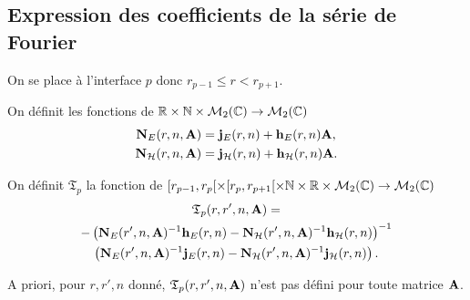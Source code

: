   \subsection{Expression des coefficients de la série de Fourier}

    On se place à l'interface \(p\) donc \(r_{p-1} \le r < r_{p+1} \).

    \begin{defn}
      \label{def:sphere:matrices_NE-NH}
      On définit les fonctions de \(\mathbb R\times \mathbb N \times \mathcal{M}_{2}(\mathbb C) \rightarrow \mathcal{M}_{2}(\mathbb C)\)
      \begin{align*}
        \mathbf{N}_{E}(r,n,\mathbf{A}) &= \mathbf{j}_{E}(r,n) + \mathbf{h}_{E}(r,n)\mathbf{A},
        \\
        \mathbf{N}_{\mathcal{H}}(r,n,\mathbf{A}) &= \mathbf{j}_{\mathcal{H}}(r,n) + \mathbf{h}_{\mathcal{H}}(r,n)\mathbf{A}.
      \end{align*}
    \end{defn}

    \begin{defn}%
      \label{def:sphere:transfert:reflexion}
      On définit \(\mathfrak{T}_p\) la fonction de \([r_{p-1}, r_p[\times[r_p, r_{p+1}[\times\mathbb N\times\mathbb R\times\mathcal{M}_2(\mathbb C)\rightarrow \mathcal{M}_{2}(\mathbb C)\)
      \begin{multline*}
        \mathfrak{T}_p(r,r',n,\mathbf{A}) = \\
          -\left(\mathbf{N}_{E}(r',n,\mathbf{A})^{-1}\mathbf{h}_{E}(r,n) - \mathbf{N}_{\mathcal{H}}(r',n,\mathbf{A})^{-1}\mathbf{h}_{\mathcal{H}}(r,n)\right)^{-1}
          \\
          \left(\mathbf{N}_{E}(r',n,\mathbf{A})^{-1}\mathbf{j}_{E}(r,n) - \mathbf{N}_{\mathcal{H}}(r',n,\mathbf{A})^{-1}\mathbf{j}_{\mathcal{H}}(r,n)\right).
      \end{multline*}
    \end{defn}
    A priori, pour \(r,r',n\) donné, \(\mathfrak{T}_p(r,r',n,\mathbf{A})\) n'est pas défini pour toute matrice \(\mathbf{A}\).

